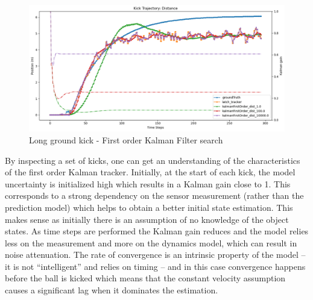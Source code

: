 \documentclass[a4paper,twoside,12pt]{report}
\begin{document}
\begin{figure}[h!]
\begin{center}
\includegraphics[width=12cm]{images/fok_ground_long.png}
\caption{Long ground kick - First order Kalman Filter search}
\label{fig:fokgroundlong}
\end{center}
\end{figure}



By inspecting a set of kicks, one can get an understanding of the characteristics of the first order Kalman tracker. Initially, at the start of each kick, the model uncertainty is initialized high which results in a Kalman gain close to 1. This corresponds to a strong dependency on the sensor measurement (rather than the prediction model) which helps to obtain a better initial state estimation. This makes sense as initially there is an assumption of no knowledge of the object states. As time steps are performed the Kalman gain reduces and the model relies less on the measurement and more on the dynamics model, which can result in noise attenuation. The rate of convergence is an intrinsic property of the model -- it is not ``intelligent'' and relies on timing -- and in this case convergence happens before the ball is kicked which means that the constant velocity assumption causes a significant lag when it dominates the estimation.
\end{document}
